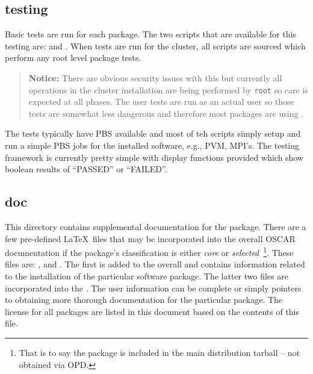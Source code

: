 \subsection{testing}
\label{sect:pkg-testing}

Basic tests are run for each package.  The two scripts that are available
for this testing are:  and .  When tests
are run for the cluster, all  scripts are sourced which
perform any root level package tests.  

\begin{verse}
   {\bfseries Notice: } There are obvious security issues with this
   but currently all operations in the cluster installation are being
   performed by {\tt root} so care is expected at all phases.  The user
   tests are run as an actual user so those tests are somewhat less 
   dangerous and therefore most packages are using .
\end{verse}


The tests typically have PBS available and most of teh 
scripts simply setup and run a simple PBS jobs for the installed software,
e.g., PVM, MPI's.  The testing framework is currently pretty simple with
display functions provided which show boolean results of ``PASSED'' or
``FAILED''.




 
\subsection{doc}

This directory contains supplemental documentation for the package.  There
are a few pre-defined \LaTeX\ files that may be incorporated into the
overall OSCAR documentation if the package's classification is either
\emph{core} or \emph{selected}~\footnote{That is to say the package is
included in the main distribution tarball -- not obtained via OPD.}.  These
files are: ,  and .  The
first is added to the overall  and contains information
related to the installation of the particular software package.  The latter
two files are incorporated into the .   The user information
can be complete or simply pointers to obtaining more thorough documentation
for the particular package.  The license for all packages are listed in
this document based on the contents of this  file.


